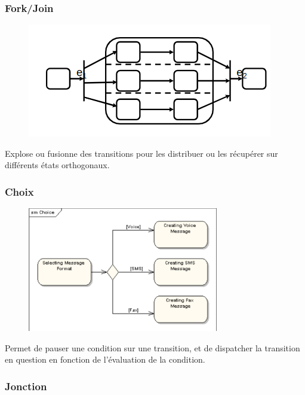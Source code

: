 \documentclass[../Syllabus.tex]{subfiles}
\begin{document}
\subsubsection{Fork/Join}

\begin{figure}
    \includegraphics[scale=0.35]{img/fork.png}
\end{figure}

Explose ou fusionne des transitions pour les distribuer ou les récupérer sur différents états orthogonaux.

\vspace{2cm}

\subsubsection{Choix}

\begin{figure}
    \includegraphics[scale=0.35]{img/choice.png}
\end{figure}

Permet de pauser une condition sur une transition, et de dispatcher la transition en question en fonction de l'évaluation de la condition.

\vspace{2cm}

\subsubsection{Jonction}
\end{document}
